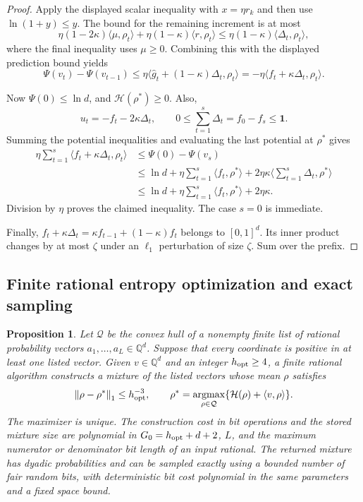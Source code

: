 \documentclass[11pt]{article}
\newtheorem{proposition}[theorem]{Proposition}
\theoremstyle{definition}
\newcommand{\norm}[1]{\left\lVert#1\right\rVert}
\newcommand{\1}{\mathbf 1}
\newcommand{\HH}{\mathcal H}
\newcommand{\QQ}{\mathcal Q}
\newcommand{\ip}[2]{\langle #1,#2\rangle}
\begin{document}
\begin{proof}
Apply the displayed scalar inequality with $x=\eta r_k$ and then use
$\ln(1+y)\le y$. The bound for the remaining increment is at most
\[
 \eta(1-2\kappa)\ip\mu{\rho_t}
 +\eta(1-\kappa)\ip r{\rho_t}
 \le\eta(1-\kappa)\ip{\Delta_t}{\rho_t},
\]
where the final inequality uses $\mu\ge0$. Combining this with
the displayed prediction bound yields
\[
 \Psi(v_t)-\Psi(v_{t-1})
 \le\eta\ip{\widehat g_t+(1-\kappa)\Delta_t}{\rho_t}
 =-\eta\ip{f_t+\kappa\Delta_t}{\rho_t}.
\]

Now $\Psi(0)\le\ln d$, and $\HH(\rho^*)\ge0$. Also,
\[
 u_t=-f_t-2\kappa\Delta_t,\qquad
 0\le\sum_{t=1}^s\Delta_t=f_0-f_s\le\boldsymbol1.
\]
Summing the potential inequalities and evaluating the last potential at
$\rho^*$ gives
\begin{align*}
 \eta\sum_{t=1}^s\ip{f_t+\kappa\Delta_t}{\rho_t}
 &\le\Psi(0)-\Psi(v_s)\\
 &\le\ln d+\eta\sum_{t=1}^s\ip{f_t}{\rho^*}
       +2\eta\kappa\ip{\sum_{t=1}^s\Delta_t}{\rho^*}\\
 &\le\ln d+\eta\sum_{t=1}^s\ip{f_t}{\rho^*}+2\eta\kappa.
\end{align*}
Division by $\eta$ proves the claimed inequality. The case $s=0$ is immediate.

Finally, $f_t+\kappa\Delta_t=\kappa f_{t-1}+(1-\kappa)f_t$
belongs to $[0,1]^d$. Its inner product changes by at most $\zeta$
under an $\ell_1$ perturbation of size $\zeta$. Sum over the prefix.
\end{proof}

\subsection{Finite rational entropy optimization and exact sampling}\label{analytic:sec:optimizer}

\begin{proposition}\label{analytic:prop:optimizer}
Let $\QQ$ be the convex hull of a nonempty finite list of rational
probability vectors $a_1,\ldots,a_L\in\mathbb Q^d$. Suppose that every
coordinate is positive in at least one listed vector. Given
$v\in\mathbb Q^d$ and an integer $h_{\rm opt}\ge4$, a finite rational algorithm
constructs a mixture of the listed vectors whose mean $\rho$ satisfies
\[
 \norm{\rho-\rho^*}_1\le h_{\rm opt}^{-3},
 \qquad
 \rho^*=\mathop{\rm argmax}_{\rho\in\QQ}
       \{\HH(\rho)+\ip v{\rho}\}.
\]
The maximizer is unique. The construction cost in bit operations and the
stored mixture size are polynomial in $G_0=h_{\rm opt}+d+2$, $L$, and the maximum
numerator or denominator bit length of an input rational. The returned
mixture has dyadic probabilities and can be sampled exactly using a
bounded number of fair random bits, with deterministic bit cost polynomial
in the same parameters and a fixed space bound.
\end{proposition}
\end{document}
